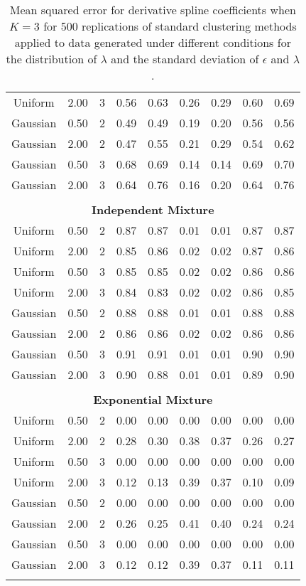\begin{table}[ht]
\begin{center}
\begin{tabular}{ccc|cccccc}
  Uniform & 2.00 &   3 & 0.56 & 0.63 & 0.26 & 0.29 & 0.60 & 0.69 \\ 
  Gaussian & 0.50 &   2 & 0.49 & 0.49 & 0.19 & 0.20 & 0.56 & 0.56 \\ 
  Gaussian & 2.00 &   2 & 0.47 & 0.55 & 0.21 & 0.29 & 0.54 & 0.62 \\ 
  Gaussian & 0.50 &   3 & 0.68 & 0.69 & 0.14 & 0.14 & 0.69 & 0.70 \\ 
  Gaussian & 2.00 &   3 & 0.64 & 0.76 & 0.16 & 0.20 & 0.64 & 0.76 \\ 
   \\ \multicolumn{9}{c}{\textbf{Independent Mixture}}\\Uniform & 0.50 &   2 & 0.87 & 0.87 & 0.01 & 0.01 & 0.87 & 0.87 \\ 
  Uniform & 2.00 &   2 & 0.85 & 0.86 & 0.02 & 0.02 & 0.87 & 0.86 \\ 
  Uniform & 0.50 &   3 & 0.85 & 0.85 & 0.02 & 0.02 & 0.86 & 0.86 \\ 
  Uniform & 2.00 &   3 & 0.84 & 0.83 & 0.02 & 0.02 & 0.86 & 0.85 \\ 
  Gaussian & 0.50 &   2 & 0.88 & 0.88 & 0.01 & 0.01 & 0.88 & 0.88 \\ 
  Gaussian & 2.00 &   2 & 0.86 & 0.86 & 0.02 & 0.02 & 0.86 & 0.86 \\ 
  Gaussian & 0.50 &   3 & 0.91 & 0.91 & 0.01 & 0.01 & 0.90 & 0.90 \\ 
  Gaussian & 2.00 &   3 & 0.90 & 0.88 & 0.01 & 0.01 & 0.89 & 0.90 \\ 
   \\ \multicolumn{9}{c}{\textbf{Exponential Mixture}}\\Uniform & 0.50 &   2 & 0.00 & 0.00 & 0.00 & 0.00 & 0.00 & 0.00 \\ 
  Uniform & 2.00 &   2 & 0.28 & 0.30 & 0.38 & 0.37 & 0.26 & 0.27 \\ 
  Uniform & 0.50 &   3 & 0.00 & 0.00 & 0.00 & 0.00 & 0.00 & 0.00 \\ 
  Uniform & 2.00 &   3 & 0.12 & 0.13 & 0.39 & 0.37 & 0.10 & 0.09 \\ 
  Gaussian & 0.50 &   2 & 0.00 & 0.00 & 0.00 & 0.00 & 0.00 & 0.00 \\ 
  Gaussian & 2.00 &   2 & 0.26 & 0.25 & 0.41 & 0.40 & 0.24 & 0.24 \\ 
  Gaussian & 0.50 &   3 & 0.00 & 0.00 & 0.00 & 0.00 & 0.00 & 0.00 \\ 
  Gaussian & 2.00 &   3 & 0.12 & 0.12 & 0.39 & 0.37 & 0.11 & 0.11 \\ 
   \thickhline\end{tabular}
\caption{Mean squared error for derivative spline coefficients when $K=3$ for 500 replications of standard clustering methods applied to data generated under different conditions for the distribution of $\lambda$ and the standard deviation of $\epsilon$ and $\lambda$.}
\label{tab:mse1}
\end{center}
\end{table}
